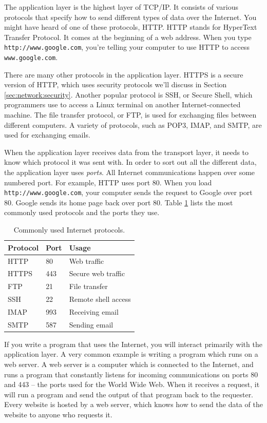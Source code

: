 The application layer is the highest layer of TCP/IP. It consists of various protocols that specify how to send different types of data over the Internet. You might have heard of one of these protocols, HTTP. HTTP stands for HyperText Transfer Protocol. It comes at the beginning of a web address. When you type \texttt{http://www.google.com}, you're telling your computer to use HTTP to access \texttt{www.google.com}.

There are many other protocols in the application layer. HTTPS is a secure version of HTTP, which uses security protocols we'll discuss in Section \ref{sec:network:security}. Another popular protocol is SSH, or Secure Shell, which programmers use to access a Linux terminal on another Internet-connected machine. The file transfer protocol, or FTP, is used for exchanging files between different computers. A variety of protocols, such as POP3, IMAP, and SMTP, are used for exchanging emails.

When the application layer receives data from the transport layer, it needs to know which protocol it was sent with. In order to sort out all the different data, the application layer uses \emph{ports}. All Internet communications happen over some numbered port. For example, HTTP uses port 80. When you load \texttt{http://www.google.com}, your computer sends the request to Google over port 80. Google sends its home page back over port 80. Table \ref{tab:common_ports} lists the most commonly used protocols and the ports they use.

\begin{table}
    \centering
    \begin{tabular}{lll}
        Protocol & Port & Usage \\
        \hline
        HTTP & 80 & Web traffic \\
        HTTPS & 443 & Secure web traffic \\
        FTP & 21 & File transfer \\
        SSH & 22 & Remote shell access \\
        IMAP & 993 & Receiving email \\
        SMTP & 587 & Sending email
    \end{tabular}
    \caption{Commonly used Internet protocols.}
    \label{tab:common_ports}
\end{table}

If you write a program that uses the Internet, you will interact primarily with the application layer. A very common example is writing a program which runs on a web server. A web server is a computer which is connected to the Internet, and runs a program that constantly listens for incoming communications on ports 80 and 443 -- the ports used for the World Wide Web. When it receives a request, it will run a program and send the output of that program back to the requester. Every website is hosted by a web server, which knows how to send the data of the website to anyone who requests it.

